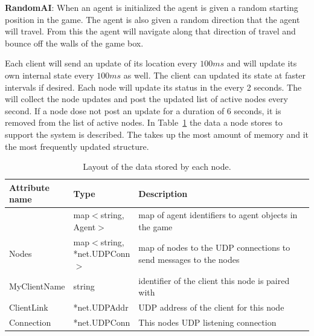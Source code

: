 \noindent \textbf{RandomAI}: When an agent is initialized the agent is given a random starting position in the game. The agent is also given a random direction that the agent will travel. From this the agent will navigate along that direction of travel and bounce off the walls of the game box.

Each client will send an update of its location every $100ms$ and will update its own internal state every $100ms$ as well. The client can updated its state at faster intervals if desired. Each node will update its status in the \kvService every 2 seconds. The \activityServer will collect the node updates and post the updated list of active nodes every second. If a node dose not post an update for a duration of $6$ seconds, it is removed from the list of active nodes. In Table~\ref{table:gamestate-discription} the data a node stores to support the system is described. The \gamestate takes up the most amount of memory and it the most frequently updated structure.

\begin{table}[htb!]
\centering
	\begin{tabular}{p{0.2\linewidth} | p{0.2\linewidth} | p{0.6\linewidth}}
	\textbf{Attribute name} & \textbf{Type} & \textbf{Description} \\ \hline
	\gamestate & map$<$string, Agent$>$ & map of agent identifiers to agent objects in the game \\ \hline
	Nodes & map$<$string, *net.UDPConn$>$ & map of nodes to the UDP connections to send messages to the nodes \\ \hline
	MyClientName & string  & identifier of the client this node is paired with\\  \hline
	ClientLink & *net.UDPAddr & UDP address of the client for this node\\ \hline
	Connection & *net.UDPConn & This nodes UDP listening connection \\ \hline	
	\end{tabular}
	\caption{\label{table:gamestate-discription} Layout of the data stored by each node.}
\end{table}
